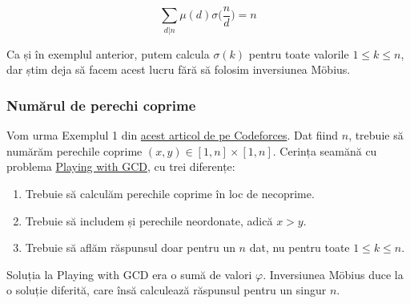 \documentclass[../main.tex]{subfiles}
\begin{document}
$$\sum_{d|n} \mu(d) \sigma\Big(\frac{n}{d}\Big) = n$$

Ca și în exemplul anterior, putem calcula $\sigma(k)$ pentru toate valorile $1 \leq k \leq n$, dar știm deja să facem acest lucru fără să folosim inversiunea Möbius.

\subsubsection*{Numărul de perechi coprime}

Vom urma Exemplul 1 din \href{https://codeforces.com/blog/entry/53925}{acest articol de pe Codeforces}. Dat fiind $n$, trebuie să numărăm perechile coprime $(x,y) \in [1, n] \times [1,n]$. Cerința seamănă cu problema \hyperref[problem:playing-with-gcd]{Playing with GCD}, cu trei diferențe:

\begin{enumerate}
  \item Trebuie să calculăm perechile coprime în loc de necoprime.
  \item Trebuie să includem și perechile neordonate, adică $x > y$.
  \item Trebuie să aflăm răspunsul doar pentru un $n$ dat, nu pentru toate $1 \leq k \leq n$.
\end{enumerate}

Soluția la Playing with GCD era o sumă de valori $\varphi$. Inversiunea Möbius duce la o soluție diferită, care însă calculează răspunsul pentru un singur $n$.
\end{document}
